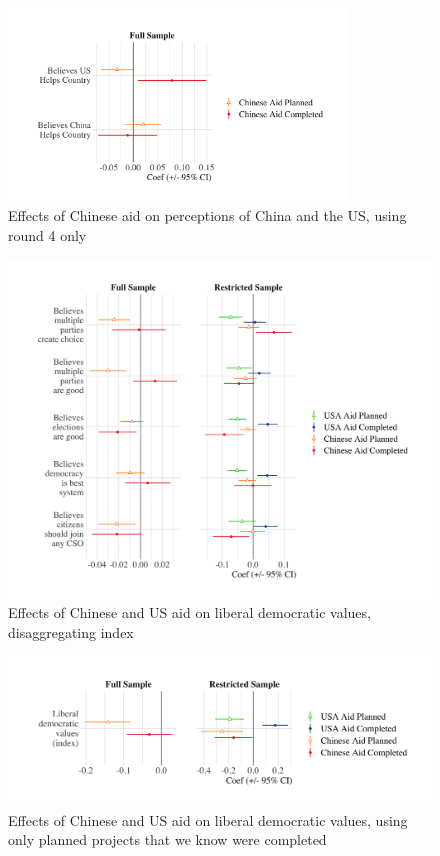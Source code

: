 \documentclass[9pt]{article}
\begin{document}
\begin{figure}[H]
\centering
\caption{Effects of Chinese aid on perceptions of China and the US, using round 4 only}
\includegraphics[width=0.8\textwidth]{figures/figure_a8.png} %
\end{figure}

\begin{figure}[H]
\centering
\caption{Effects of Chinese and US aid on liberal democratic values, disaggregating index}
\includegraphics[width=1\textwidth]{figures/figure_a9.png} %
\end{figure}

\begin{figure}[H]
\centering
\caption{Effects of Chinese and US aid on liberal democratic values, using only planned projects that we know were completed}
\includegraphics[width=1\textwidth]{figures/figure_a10.png} %
\end{figure}
\end{document}
